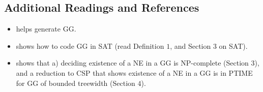 \documentclass[a4paper,10pt]{article}
\begin{document}
\subsection*{Additional Readings and References}

\begin{itemize}
 \item \cite{DBLP:conf/atal/NudelmanWSL04} helps generate GG.
 \item \cite{DBLP:conf/atal/IsmailiBMP13} shows how to code GG in SAT (read Definition $1$, and Section $3$ on SAT).
 \item \cite{DBLP:journals/corr/abs-1109-2152} shows that a) deciding existence of a NE in a GG is NP-complete (Section $3$), and 
 a reduction to CSP that shows existence of a NE in a GG is in PTIME for GG of bounded treewidth (Section $4$).
\end{itemize}





% 
% 
% 
% 
\end{document}
